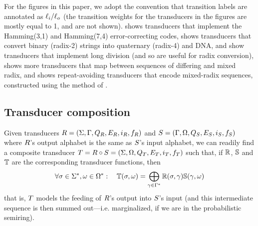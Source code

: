 \documentclass[english]{article}
\begin{document}
For the figures in this paper,
we adopt the convention that transition labels are annotated as $\ell_i{\tt /}\ell_o$
(the transition weights for the transducers in the figures are mostly equal to 1, and are not shown).
 shows transducers that implement the Hamming(3,1) and Hamming(7,4) error-correcting codes,
 shows transducers that convert binary (radix-2) strings into quaternary (radix-4) and DNA,
 and  show transducers that implement long division
(and so are useful for radix conversion),
 shows more transducers that map between sequences of differing and mixed radix,
and  shows repeat-avoiding transducers that encode mixed-radix sequences,
constructed using the method of .

\subsection{Transducer composition}

Given transducers
 $R = (\Sigma, \Gamma, Q_{R}, E_{R}, i_{R}, f_{R})$ and
 $S = (\Gamma, \Omega, Q_{S}, E_{S}, i_{S}, f_{S})$
where $R$'s output alphabet is the same as $S$'s input alphabet,
we can readily find a composite transducer
 $T = R \circ S = (\Sigma, \Omega, Q_{T}, E_{T}, i_{T}, f_{T})$
such that, if $\mathbb{R}$, $\mathbb{S}$ and $\mathbb{T}$ are the corresponding transducer functions,
then
\[
\forall \sigma \in {\Sigma}^{\ast}, \omega \in {\Omega}^{\ast}:
\quad
\mathbb{T}(\sigma,\omega) = \bigoplus_{\gamma \in {\Gamma}^{\ast}} \mathbb{R}(\sigma,\gamma) \mathbb{S}(\gamma,\omega)
\]
that is, $T$ models the feeding of $R$'s output into $S$'s input
(and this intermediate sequence is then summed out---i.e. marginalized, if we are in the probabilistic semiring).
\end{document}
